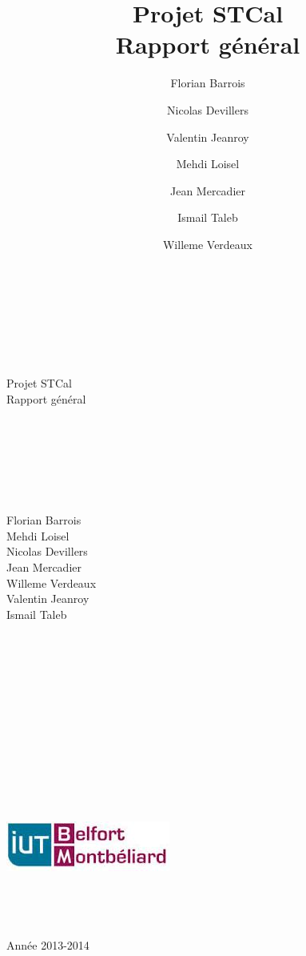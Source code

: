 \documentclass[a4paper,10pt]{report}
\date{}
\title{\Huge{Projet STCal}\\ {\Large Rapport général}}
\author{Florian Barrois \and Nicolas Devillers \and Valentin Jeanroy \and Mehdi Loisel \and Jean Mercadier \and Ismail Taleb \and Willeme Verdeaux}
\begin{document}
 \begin{titlepage}

\begin{center}
~\\~\\~\\~\\~\\
\Huge
Projet STCal\\
\LARGE
Rapport général\\
~\\~\\~\\~\\~\\~\\
\begin{multicols}{3}
\large
Florian Barrois\\Mehdi Loisel\\
\columnbreak 
Nicolas Devillers\\Jean Mercadier\\Willeme Verdeaux\\
\columnbreak
Valentin Jeanroy\\Ismail Taleb
\end{multicols}
\end{center}


\begin{center}
~\\~\\~\\~\\~\\~\\~\\~\\~\\~\\~\\~\\
 \includegraphics{iutbm.jpeg}
 ~\\~\\~\\~\\~\\
\large
Année 2013-2014
\end{center}

\end{titlepage}
\end{document}

